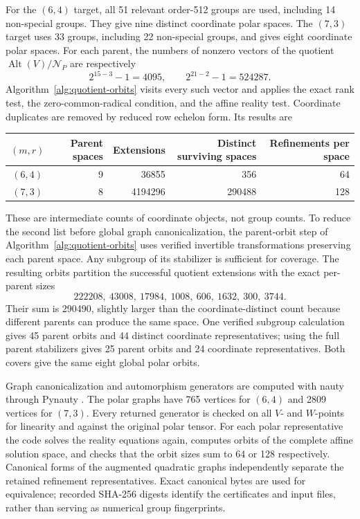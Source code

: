 \documentclass[11pt,a4paper]{amsart}
\theoremstyle{definition}
\theoremstyle{remark}
\DeclareMathOperator{\Alt}{Alt}
\numberwithin{equation}{section}
\begin{document}
For the $(6,4)$ target, all 51 relevant order-512 groups are used,
including 14 non-special groups. They give nine distinct coordinate
polar spaces. The $(7,3)$ target uses 33 groups, including 22
non-special groups, and gives eight coordinate polar spaces.
For each parent, the numbers of nonzero vectors of the quotient
$\Alt(V)/\mathcal N_P$ are respectively
\[
 2^{15-3}-1=4095,\qquad 2^{21-2}-1=524287.
\]
Algorithm~\ref{alg:quotient-orbits} visits every such vector
and applies the exact rank test, the zero-common-radical condition,
and the affine reality test. Coordinate duplicates are removed by
reduced row echelon form. Its results are
\begin{center}\small
\begin{tabular}{@{}crrrr@{}}\toprule
$(m,r)$&Parent spaces&Extensions&Distinct surviving spaces&Refinements per space\\\midrule
$(6,4)$&9&36855&356&64\\
$(7,3)$&8&4194296&290488&128\\\bottomrule
\end{tabular}
\end{center}
These are intermediate counts of coordinate objects, not group counts.
To reduce the second list before global graph canonicalization,
the parent-orbit step of Algorithm~\ref{alg:quotient-orbits} uses verified invertible
transformations preserving each parent space. Any subgroup of its
stabilizer is sufficient for coverage. The resulting orbits partition
the successful quotient extensions with the exact per-parent sizes
\[
222208,\ 43008,\ 17984,\ 1008,\ 606,\ 1632,\ 300,\ 3744.
\]
Their sum is 290490, slightly larger than the coordinate-distinct
count because different parents can produce the same space.
One verified subgroup calculation gives 45 parent orbits and 44
distinct coordinate representatives; using the full parent stabilizers
gives 25 parent orbits and 24 coordinate representatives. Both covers
give the same eight global polar orbits.

Graph canonicalization and automorphism generators are computed with
nauty through Pynauty \cite{McKayPiperno2014,Pynauty}.
The polar graphs have 765 vertices for $(6,4)$ and 2809 vertices for
$(7,3)$. Every returned generator is checked on all $V$- and
$W$-points for linearity and against the original polar tensor.
For each polar representative the code solves the reality equations
again, computes orbits of the complete affine solution space, and
checks that the orbit sizes sum to 64 or 128 respectively. Canonical
forms of the augmented quadratic graphs independently separate the
retained refinement representatives. Exact canonical bytes are used
for equivalence; recorded SHA-256 digests identify the certificates
and input files, rather than serving as numerical group fingerprints.
\end{document}
